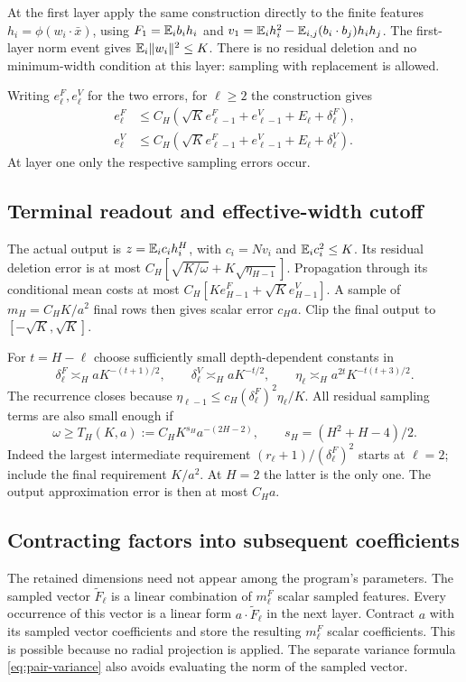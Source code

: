 At the first layer apply the same construction directly to the finite features $h_i=\phi(w_i\cdot\bar x)$, using
$F_1=\mathbb E_i b_i h_i$ and $v_1=\mathbb E_i h_i^2-\mathbb E_{i,j}(b_i\cdot b_j)h_ih_j$.
The first-layer norm event gives $\mathbb E_i\|w_i\|^2\le K$. There is no residual deletion and no minimum-width condition at this layer: sampling with replacement is allowed.

Writing $e_\ell^F,e_\ell^V$ for the two errors, for $\ell\ge2$ the construction gives
\begin{align*}
 e_\ell^F&\le C_H(\sqrt K e_{\ell-1}^F+e_{\ell-1}^V+E_\ell+\delta_\ell^F),\\
 e_\ell^V&\le C_H(\sqrt K e_{\ell-1}^F+e_{\ell-1}^V+E_\ell+\delta_\ell^V).
\end{align*}
At layer one only the respective sampling errors occur.

\subsection{Terminal readout and effective-width cutoff}
The actual output is $z=\mathbb E_i c_i h_i^H$, with $c_i=Nv_i$ and $\mathbb E_i c_i^2\le K$. Its residual deletion error is at most
$C_H[\sqrt{K/\omega}+K\sqrt{\eta_{H-1}}]$.
Propagation through its conditional mean costs at most
$C_H[K e_{H-1}^F+\sqrt K e_{H-1}^V]$.
A sample of $m_H=C_HK/a^2$ final rows then gives scalar error $c_Ha$. Clip the final output to $[-\sqrt K,\sqrt K]$.

For $t=H-\ell$ choose sufficiently small depth-dependent constants in
\[
 \delta_\ell^F\asymp_H aK^{-(t+1)/2},\qquad
 \delta_\ell^V\asymp_H aK^{-t/2},\qquad
 \eta_\ell\asymp_H a^{2t}K^{-t(t+3)/2}.
\]
The recurrence closes because $\eta_{\ell-1}\le c_H(\delta_\ell^F)^2\eta_\ell/K$. All residual sampling terms are also small enough if
\begin{equation}
 \omega\ge T_H(K,a):=C_HK^{s_H}a^{-(2H-2)},\qquad
 s_H=(H^2+H-4)/2.
 \label{eq:direct-width}
\end{equation}
Indeed the largest intermediate requirement $(r_\ell+1)/(\delta_\ell^F)^2$ starts at $\ell=2$; include the final requirement $K/a^2$. At $H=2$ the latter is the only one. The output approximation error is then at most $C_Ha$.

\subsection{Contracting factors into subsequent coefficients}
The retained dimensions need not appear among the program's parameters. The sampled vector $\widetilde F_\ell$ is a linear combination of $m_\ell^F$ scalar sampled features. Every occurrence of this vector is a linear form $a\cdot\widetilde F_\ell$ in the next layer. Contract $a$ with its sampled vector coefficients and store the resulting $m_\ell^F$ scalar coefficients. This is possible because no radial projection is applied. The separate variance formula \eqref{eq:pair-variance} also avoids evaluating the norm of the sampled vector.

